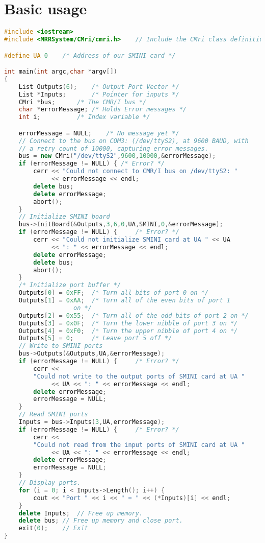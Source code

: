 \section{Basic usage}
\begin{lstlisting}[caption={Using the CMR/I from C++},
		   language=C++,
		   label=lst:CMRI:Cpp1]
#include <iostream>
#include <MRRSystem/CMri/cmri.h>	// Include the CMri class definition

#define UA 0	/* Address of our SMINI card */

int main(int argc,char *argv[])
{
	List Outputs(6);	/* Output Port Vector */
	List *Inputs;		/* Pointer for inputs */
	CMri *bus;		/* The CMR/I bus */
	char *errorMessage;	/* Holds Error messages */
	int i;			/* Index variable */

	errorMessage = NULL;	/* No message yet */
	// Connect to the bus on COM3: (/dev/ttyS2), at 9600 BAUD, with
	// a retry count of 10000, capturing error messages.
	bus = new CMri("/dev/ttyS2",9600,10000,&errorMessage);
	if (errorMessage != NULL) {	/* Error? */
		cerr << "Could not connect to CMR/I bus on /dev/ttyS2: " 
		     << errorMessage << endl;
		delete bus;
		delete errorMessage;
		abort();
	}
	// Initialize SMINI board
	bus->InitBoard(&Outputs,3,6,0,UA,SMINI,0,&errorMessage);
	if (errorMessage != NULL) {     /* Error? */  
		cerr << "Could not initialize SMINI card at UA " << UA
		     << ": " << errorMessage << endl;
		delete errorMessage;
		delete bus;
		abort();
	}
	/* Initialize port buffer */
	Outputs[0] = 0xFF;	/* Turn all bits of port 0 on */
	Outputs[1] = 0xAA;	/* Turn all of the even bits of port 1
				   on */
	Outputs[2] = 0x55;	/* Turn all of the odd bits of port 2 on */
	Outputs[3] = 0x0F;	/* Turn the lower nibble of port 3 on */
	Outputs[4] = 0xF0;	/* Turn the upper nibble of port 4 on */
	Outputs[5] = 0;		/* Leave port 5 off */
	// Write to SMINI ports
	bus->Outputs(&Outputs,UA,&errorMessage);
	if (errorMessage != NULL) {     /* Error? */
		cerr << 
		"Could not write to the output ports of SMINI card at UA " 
		     << UA << ": " << errorMessage << endl;
		delete errorMessage;
		errorMessage = NULL;
	}
	// Read SMINI ports
	Inputs = bus->Inputs(3,UA,errorMessage);
	if (errorMessage != NULL) {     /* Error? */
		cerr <<
		"Could not read from the input ports of SMINI card at UA "
		     << UA << ": " << errorMessage << endl;
		delete errorMessage;
		errorMessage = NULL;
	}
	// Display ports.
	for (i = 0; i < Inputs->Length(); i++) {
		cout << "Port " << i << " = " << (*Inputs)[i] << endl;
	}
	delete Inputs; 	// Free up memory.
	delete bus;	// Free up memory and close port.
	exit(0);	// Exit
}
\end{lstlisting}
